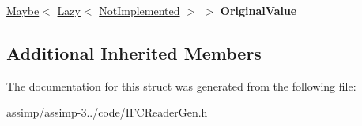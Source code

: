\begin{DoxyCompactItemize}
\item 
\hypertarget{struct_assimp_1_1_i_f_c_1_1_ifc_inventory_a915afec7634a66b931738c13e83669a9}{\hyperlink{struct_assimp_1_1_s_t_e_p_1_1_maybe}{Maybe}$<$ \hyperlink{struct_assimp_1_1_s_t_e_p_1_1_lazy}{Lazy}$<$ \hyperlink{struct_assimp_1_1_i_f_c_1_1_not_implemented}{Not\+Implemented} $>$ $>$ {\bfseries Original\+Value}}\label{struct_assimp_1_1_i_f_c_1_1_ifc_inventory_a915afec7634a66b931738c13e83669a9}

\end{DoxyCompactItemize}
\subsection*{Additional Inherited Members}


The documentation for this struct was generated from the following file\+:\begin{DoxyCompactItemize}
\item 
assimp/assimp-\/3../code/I\+F\+C\+Reader\+Gen.\+h\end{DoxyCompactItemize}
